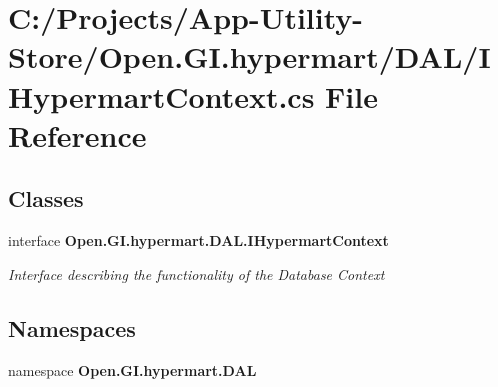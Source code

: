 \section{C\+:/\+Projects/\+App-\/\+Utility-\/\+Store/\+Open.G\+I.\+hypermart/\+D\+A\+L/\+I\+Hypermart\+Context.cs File Reference}
\label{_i_hypermart_context_8cs}
\subsection*{Classes}
\begin{DoxyCompactItemize}
\item 
interface \textbf{ Open.\+G\+I.\+hypermart.\+D\+A\+L.\+I\+Hypermart\+Context}
\begin{DoxyCompactList}\small\item\em Interface describing the functionality of the Database Context \end{DoxyCompactList}\end{DoxyCompactItemize}
\subsection*{Namespaces}
\begin{DoxyCompactItemize}
\item 
namespace \textbf{ Open.\+G\+I.\+hypermart.\+D\+AL}
\end{DoxyCompactItemize}
